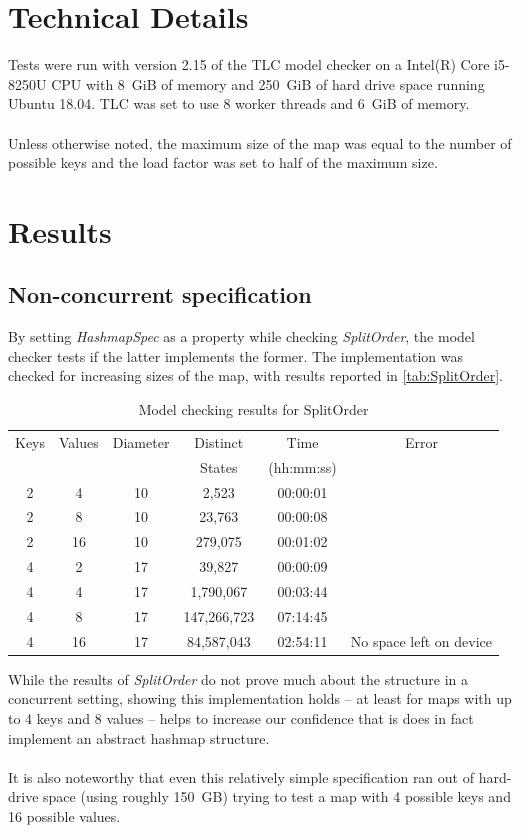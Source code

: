 \documentclass{uit-thesis}
\begin{document}
\section{Technical Details}
Tests were run with version 2.15 of the TLC model checker on a Intel(R) Core i5-8250U CPU with 8~GiB of memory and 250~GiB of hard drive space running Ubuntu 18.04. TLC was set to use 8 worker threads and 6~GiB of memory.
\\\\
Unless otherwise noted, the maximum size of the map was equal to the number of possible keys and the load factor was set to half of the maximum size.

\section{Results}
\subsection{Non-concurrent specification}
By setting \textit{HashmapSpec} as a property while checking \textit{SplitOrder}, the model checker tests if the latter implements the former. The implementation was checked for increasing sizes of the map, with results reported in \autoref{tab:SplitOrder}.
\begin{table}[h]
    \begin{tabular}{ |c|c||c|c|c|c| }
        \hline
        Keys & Values & Diameter & Distinct & Time & Error\\
        &        &          & States   & (hh:mm:ss)&\\
        \hline
        2 & 4  & 10 & 2,523      & 00:00:01 &\\
        2 & 8  & 10 & 23,763     & 00:00:08 &\\
        2 & 16 & 10 & 279,075    & 00:01:02 &\\
        4 & 2  & 17 & 39,827     & 00:00:09 &\\
        4 & 4  & 17 & 1,790,067  & 00:03:44 &\\
        4 & 8  & 17 & 147,266,723& 07:14:45 &\\
        4 & 16 & 17 & 84,587,043 & 02:54:11 & No space left on device\\
        \hline
    \end{tabular}
\caption{Model checking results for SplitOrder}
\label{tab:SplitOrder}
\end{table}
While the results of \textit{SplitOrder} do not prove much about the structure in a concurrent setting, showing this implementation holds -- at least for maps with up to 4 keys and 8 values -- helps to increase our confidence that is does in fact implement an abstract hashmap structure.
\\\\
It is also noteworthy that even this relatively simple specification ran out of hard-drive space (using roughly 150~GB) trying to test a map with 4 possible keys and 16 possible values.
\end{document}

